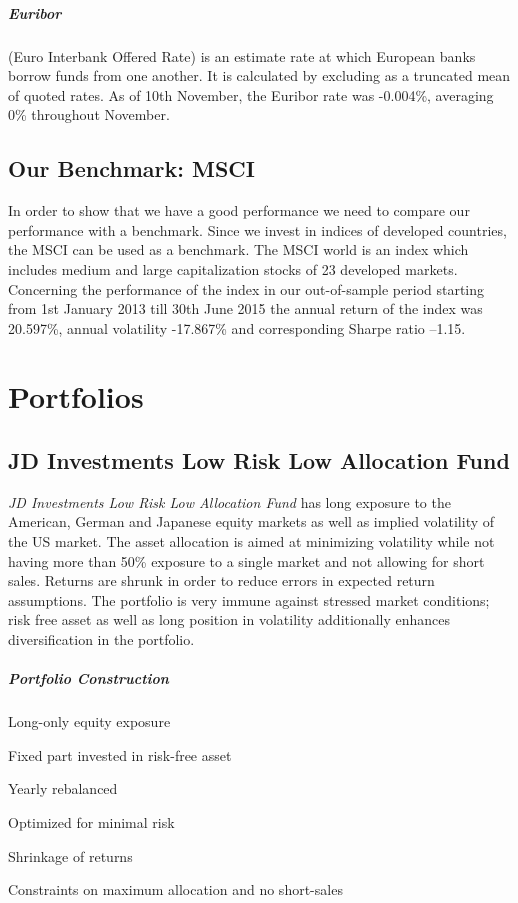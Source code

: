\documentclass[11pt, DIV=15]{scrreprt}
\begin{document}
\paragraph{Euribor} (Euro Interbank Offered Rate) is an estimate rate at which European banks borrow funds from one another.
It is calculated by excluding as a truncated mean of quoted rates.
As of 10th November, the Euribor rate was -0.004\%, averaging 0\% throughout November.


\section*{Our Benchmark: MSCI}
In order to show that we have a good performance we need to compare our performance with a benchmark.
Since we invest in indices of developed countries, the MSCI can be used as a benchmark.
The MSCI world is an index  which includes medium and large capitalization stocks of 23 developed markets.
Concerning the performance of the index in our out-of-sample period starting from 1st January 2013 till 30th June 2015 the annual return of the index was 20.597\%, annual volatility -17.867\% and corresponding Sharpe ratio –1.15.


\chapter*{Portfolios}

\newpage\section*{JD Investments Low Risk Low Allocation Fund}
\begin{multicols}{2}
\textit{JD Investments Low Risk Low Allocation Fund} has long exposure to the American, German and Japanese equity markets as well as implied volatility of the US market.
The asset allocation is aimed at minimizing volatility while not having more than 50\% exposure to a single market and not allowing for short sales.
Returns are shrunk in order to reduce errors in expected return assumptions.
The portfolio is very immune against stressed market conditions; risk free asset as well as long position in volatility additionally enhances diversification in the portfolio.

%
\paragraph{Portfolio Construction}
\begin{sit}
\item	Long-only equity exposure
\item	Fixed part invested in risk-free asset
\item	Yearly rebalanced
\item	Optimized for minimal risk
\item Shrinkage of returns
\item	Constraints on maximum allocation and no short-sales
\end{sit}

\end{multicols}
\end{document}
